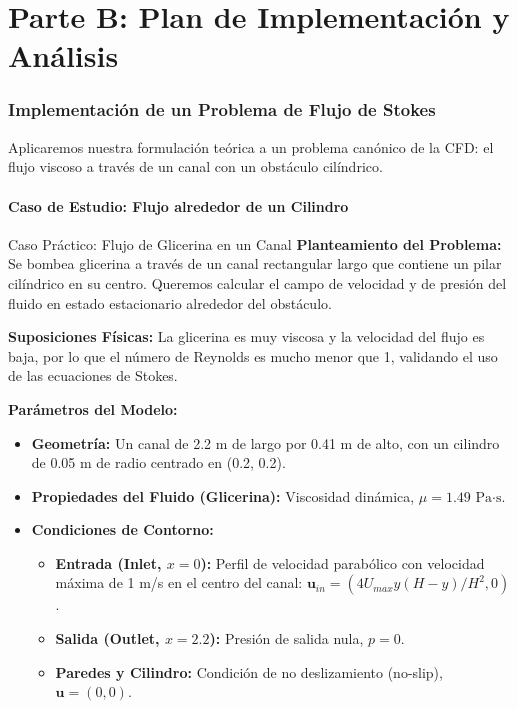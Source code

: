 \part*{Parte B: Plan de Implementación y Análisis}

\section{Implementación de un Problema de Flujo de Stokes}
Aplicaremos nuestra formulación teórica a un problema canónico de la CFD: el flujo viscoso a través de un canal con un obstáculo cilíndrico.

\subsection{Caso de Estudio: Flujo alrededor de un Cilindro}
\begin{examplebox}{Caso Práctico: Flujo de Glicerina en un Canal}
    \textbf{Planteamiento del Problema:} Se bombea glicerina a través de un canal rectangular largo que contiene un pilar cilíndrico en su centro. Queremos calcular el campo de velocidad y de presión del fluido en estado estacionario alrededor del obstáculo.
    
    \textbf{Suposiciones Físicas:} La glicerina es muy viscosa y la velocidad del flujo es baja, por lo que el número de Reynolds es mucho menor que 1, validando el uso de las ecuaciones de Stokes.
    
    \textbf{Parámetros del Modelo:}
    \begin{itemize}
        \item \textbf{Geometría:} Un canal de 2.2 m de largo por 0.41 m de alto, con un cilindro de 0.05 m de radio centrado en (0.2, 0.2).
        \item \textbf{Propiedades del Fluido (Glicerina):} Viscosidad dinámica, $\mu = 1.49 \text{ Pa·s}$.
        \item \textbf{Condiciones de Contorno:}
             \begin{itemize}
                \item \textbf{Entrada (Inlet, $x=0$):} Perfil de velocidad parabólico con velocidad máxima de 1 m/s en el centro del canal: $\mathbf{u}_{in} = (4 U_{max} y(H-y)/H^2, 0)$.
                \item \textbf{Salida (Outlet, $x=2.2$):} Presión de salida nula, $p=0$.
                \item \textbf{Paredes y Cilindro:} Condición de no deslizamiento (no-slip), $\mathbf{u} = (0,0)$.
            \end{itemize}
    \end{itemize}
\end{examplebox}

